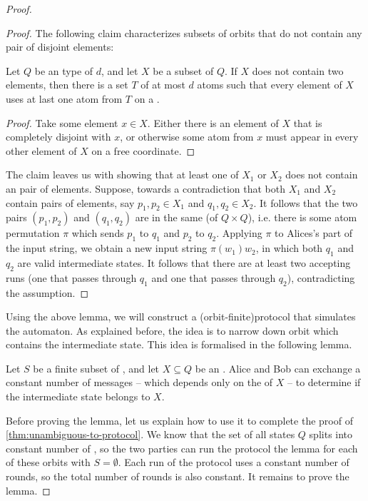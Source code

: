 \begin{proof}
\begin{proof}
The following claim characterizes subsets of orbits that do not contain any pair of disjoint elements:
\begin{claim}\label{claim:sunflower}
  Let $Q$ be an  type of  $d$, and let $X$ be a subset of $Q$.
  If $X$ does not contain two  elements, then there is a
  set $T$ of at most $d$ atoms such that every element of $X$ uses at last one atom from $T$ on a .
\end{claim}
\begin{proof}
        Take some element $x \in X$. Either there is an element of $X$ that is completely disjoint with $x$, or otherwise some atom from $x$ must appear in every other element of $X$ on a free coordinate.
\end{proof}

The claim leaves us with showing that at least one of $X_1$ or $X_2$ does not
contain an  pair of elements. Suppose, towards a contradiction that
both $X_1$ and $X_2$ contain  pairs of elements, say $p_1, p_2 \in
X_1$ and $q_1, q_2 \in X_2$. It follows that the two pairs $(p_1,p_2)$ and
$(q_1,q_2)$ are in the same  (of $Q \times Q$), i.e. there is
some atom permutation $\pi$ which sends $p_1$ to $q_1$ and $p_2$ to $q_2$.
Applying $\pi$ to Alices's part of the input string, we obtain a new input
string $\pi(w_1) w_2$, in which both $q_1$ and $q_2$ are valid intermediate
states. It follows that there are at least two accepting runs (one that passes
through $q_1$ and one that passes through $q_2$), contradicting the 
assumption. 
\end{proof}

Using the above lemma, we will construct a \kl(orbit-finite){protocol} that
simulates the automaton. As explained before, the idea is to narrow down orbit
which contains the intermediate state. This idea is formalised in the following
lemma. 


\begin{lemma}\label{lem:narrow-down-orbit}
  Let $S$ be a finite subset of , and let $X \subseteq Q$ be an . 
  Alice and Bob can exchange a constant number of messages
  -- which depends only on the  of $X$ -- 
  to determine if the intermediate state belongs to $X$. 
\end{lemma}

Before proving the lemma, let us explain how to use it to complete the proof of
\cref{thm:unambiguous-to-protocol}. We know that the set of all states $Q$
splits into constant number of , so the two parties can run
the protocol the lemma for each of these orbits with $S=\emptyset$. Each run of
the protocol uses a constant number of rounds, so the total number of rounds is
also constant. It remains to prove the lemma.


\end{proof}
